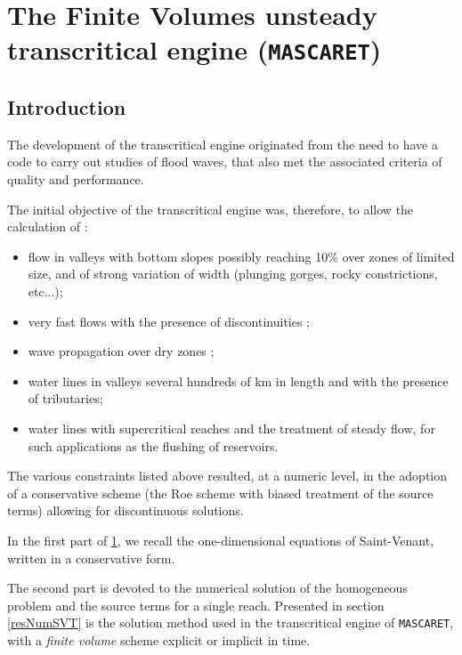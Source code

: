 \section[The F.V. unsteady transcritical engine]{The Finite Volumes unsteady transcritical \linebreak engine (\texttt{MASCARET})} \label{MSCT}

\subsection{Introduction}

The development of the transcritical engine originated from the need to have a code to carry out studies of flood waves, that also met the associated criteria of quality and performance.

\vspace{0.5cm}

The initial objective of the transcritical engine was, therefore, to allow the calculation of :
\begin{itemize}
 \item flow in valleys with bottom slopes possibly reaching 10\% over zones of limited size, and of strong variation of width (plunging gorges, rocky constrictions, etc...);
 \item very fast flows with the presence of discontinuities ;
 \item wave propagation over dry zones ;
 \item water lines in valleys several hundreds of km in length and with the presence of tributaries;
 \item water lines with supercritical reaches and the treatment of steady flow, for such applications as the flushing of reservoirs.
\end{itemize}

\vspace{0.5cm}

The various constraints listed above resulted, at a numeric level, in the adoption of a conservative scheme (the Roe scheme with biased treatment of the source terms) allowing for discontinuous solutions.

\vspace{0.5cm}

In the first part of \ref{MSCT}, we recall the one-dimensional equations of Saint-Venant, written in a conservative form.

\vspace{0.5cm}

The second part is devoted to the numerical solution of the homogeneous problem and the source terms for a single reach. Presented in section \ref{resNumSVT} is the solution method used in the transcritical engine of \texttt{MASCARET}, with a \textit{finite volume} scheme explicit or implicit in time.

